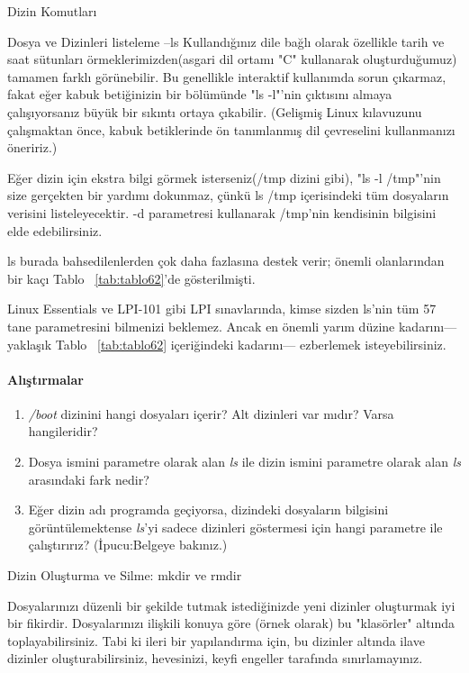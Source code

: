 \begin{section}{Dizin Komutları}
\begin{subsection}{Dosya ve Dizinleri listeleme --ls}
Kullandığınız dile bağlı olarak özellikle tarih ve saat sütunları örmeklerimizden(asgari dil ortamı "C" kullanarak oluşturduğumuz) tamamen farklı görünebilir. Bu genellikle interaktif kullanımda sorun çıkarmaz, fakat eğer kabuk betiğinizin bir bölümünde "ls -l"'nin çıktısını almaya çalışıyorsanız büyük bir sıkıntı ortaya çıkabilir. (Gelişmiş Linux kılavuzunu çalışmaktan önce, kabuk betiklerinde ön tanımlanmış dil çevreselini kullanmanızı öneririz.)
	
Eğer dizin için ekstra bilgi görmek isterseniz(/tmp dizini gibi), "ls -l /tmp"'nin size gerçekten bir yardımı dokunmaz, çünkü ls /tmp içerisindeki tüm dosyaların verisini listeleyecektir. -d parametresi kullanarak /tmp'nin kendisinin bilgisini elde edebilirsiniz.
	
ls burada bahsedilenlerden çok daha fazlasına destek verir; önemli olanlarından bir kaçı Tablo ~\ref{tab:tablo62}'de gösterilmişti.

Linux Essentials ve LPI-101 gibi LPI sınavlarında, kimse sizden ls'nin tüm 57 tane parametresini bilmenizi beklemez. Ancak en önemli yarım düzine kadarını—yaklaşık Tablo ~\ref{tab:tablo62} içeriğindeki kadarını— ezberlemek isteyebilirsiniz.
\paragraph{{\Huge{\PencilLeftDown}}Alıştırmalar}{
\begin{enumerate}
 \item \emph{/boot} dizinini hangi dosyaları içerir? Alt dizinleri var mıdır? Varsa hangileridir?
 \item Dosya ismini parametre olarak alan \emph{ls} ile dizin ismini parametre olarak alan \emph{ls} arasındaki fark nedir?
 \item Eğer dizin adı programda geçiyorsa, dizindeki dosyaların bilgisini görüntülemektense \emph{ls}'yi sadece dizinleri göstermesi için hangi parametre ile çalıştırırız? (İpucu:Belgeye bakınız.)
\end{enumerate}}
\end{subsection}
\begin{subsection}{Dizin Oluşturma ve Silme: mkdir ve rmdir}

Dosyalarınızı düzenli bir şekilde tutmak istediğinizde yeni dizinler oluşturmak iyi bir fikirdir. Dosyalarınızı ilişkili konuya göre (örnek olarak) bu "klasörler" altında toplayabilirsiniz. Tabi ki ileri bir yapılandırma için, bu dizinler altında ilave dizinler oluşturabilirsiniz, hevesinizi, keyfi engeller tarafında sınırlamayınız.


\end{subsection}
\end{section}
